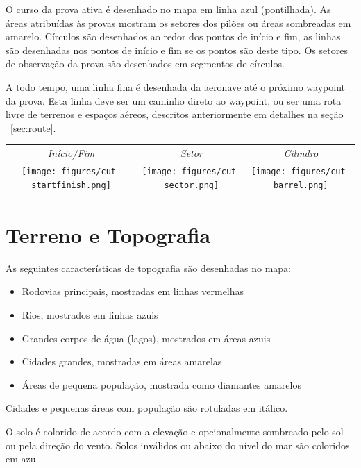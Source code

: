 O curso da prova ativa é desenhado no mapa em linha azul (pontilhada).  As áreas atribuídas às provas mostram os setores dos pilões ou áreas sombreadas em amarelo.  Círculos são desenhados ao redor dos pontos de início e fim, as linhas são desenhadas nos pontos de início e fim se os pontos são deste tipo.  Os setores de observação da prova são desenhados em segmentos de círculos.

A todo tempo, uma linha fina é desenhada da aeronave até o próximo waypoint da prova.  Esta linha deve ser um caminho direto ao waypoint, ou ser uma rota livre de terrenos e espaços aéreos, descritos anteriormente em detalhes na seção
~\ref{sec:route}.

\begin{center}
\begin{tabular}{c c c}
{\it Início/Fim} & {\it Setor} & {\it Cilindro} \\
\texttt{[image: figures/cut-startfinish.png]} &
\texttt{[image: figures/cut-sector.png]} &
\texttt{[image: figures/cut-barrel.png]} \\
\end{tabular}
\end{center}


\section{Terreno e Topografia}\label{sec:terrain_topo}

As seguintes características de topografia são desenhadas no mapa:
\begin{itemize}
\item Rodovias principais, mostradas em linhas vermelhas
\item Rios, mostrados em linhas azuis
\item Grandes corpos de água (lagos), mostrados em áreas azuis
\item Cidades grandes, mostradas em áreas amarelas
\item Áreas de pequena população, mostrada como diamantes amarelos 
\end{itemize}
Cidades e pequenas áreas com população são rotuladas em itálico.

O solo é colorido de acordo com a elevação e opcionalmente sombreado pelo sol ou pela direção do vento.  Solos inválidos ou abaixo do nível do mar são coloridos em azul.



